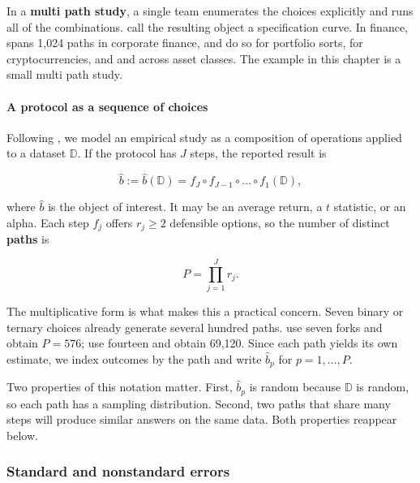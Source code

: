 In a \textbf{multi path study}, a single team enumerates the choices explicitly and runs all of the combinations. \cite{simonsohn2020specification} call the resulting object a specification curve. In finance, \cite{mitton2021methodological} spans 1,024 paths in corporate finance, \cite{soebhag2022mind} and \cite{walter2022non} do so for portfolio sorts, \cite{fieberg2024non} for cryptocurrencies, and \cite{battistella2025multiverse} and \cite{cakici2025lost} across asset classes. The example in this chapter is a small multi path study.

\paragraph{A protocol as a sequence of choices}

Following \cite{coqueret2026persistent}, we model an empirical study as a composition of operations applied to a dataset $\mathbb{D}$. If the protocol has $J$ steps, the reported result is

\begin{equation}
\label{eq_design_path}
\hat{b} := \hat{b}(\mathbb{D}) = f_J \circ f_{J-1} \circ \dots \circ f_1(\mathbb{D}),
\end{equation}

where $\hat{b}$ is the object of interest. It may be an average return, a $t$ statistic, or an alpha. Each step $f_j$ offers $r_j \ge 2$ defensible options, so the number of distinct \textbf{paths} is

\begin{equation}
\label{eq_design_count}
P = \prod_{j=1}^J r_j.
\end{equation}

The multiplicative form is what makes this a practical concern. Seven binary or ternary choices already generate several hundred paths. \cite{coqueret2026persistent} use seven forks and obtain $P = 576$; \cite{walter2022non} use fourteen and obtain 69,120. Since each path yields its own estimate, we index outcomes by the path and write $\hat{b}_p$ for $p = 1, \dots, P$.

Two properties of this notation matter. First, $\hat{b}_p$ is random because $\mathbb{D}$ is random, so each path has a sampling distribution. Second, two paths that share many steps will produce similar answers on the same data. Both properties reappear below.

\subsubsection{Standard and nonstandard errors}\label{sec_design_nse}

